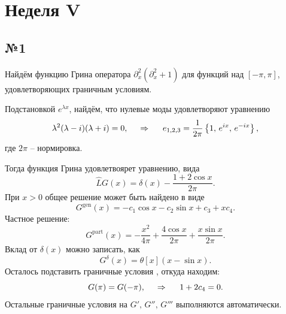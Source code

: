 \newpage

\section{Неделя V}


\subsection*{№1}

Найдём функцию Грина оператора $\partial_x^2 (\partial_x^2 + 1)$ для функций над $[-\pi, \pi]$, удовлетворяющих граничным условиям. 

Подстановкой $e^{\lambda x}$, найдём, что нулевые моды удовлетворяют уравнению
\begin{equation*}
    \lambda^2 (\lambda - i)(\lambda + i) = 0,
    \hspace{0.5cm} \Rightarrow \hspace{0.5cm}
    e_{1, 2, 3} = \frac{1}{2\pi} \left\{1,\,  e^{ix},\,  e^{-ix}\right\},
\end{equation*}
где $2 \pi$ -- нормировка. 

Тогда функция Грина удовлетвоярет уравнению, вида
\begin{equation*}
    \hat{L} G(x) = \delta(x) - \frac{1 + 2 \cos x}{2\pi}.
\end{equation*}
При $x > 0$ общее решение может быть найдено в виде
\begin{equation*}
    G^{\text{gen}}(x) = -c_1 \cos x - c_2 \sin x + c_3 + x c_4.
\end{equation*}
Частное решение:
\begin{equation*}
    G^{\text{part}}(x) = -\frac{x^2}{4\pi} + \frac{4 \cos x}{2\pi} + \frac{x \sin x}{2\pi}.
\end{equation*}
Вклад от $\delta(x)$ можно записать, как
\begin{equation*}
    G^{\delta}(x) = \theta[x] (x -\sin x).
\end{equation*}
Осталось подставить граничные условия , откуда находим:
\begin{equation*}
    G(\pi) = G(-\pi),
    \hspace{0.5cm} \Rightarrow \hspace{0.5cm}
    1 + 2 c_4 = 0.
\end{equation*}
Остальные граничные условия на $G',\, G'',\, G'''$ выполняются автоматически. 

